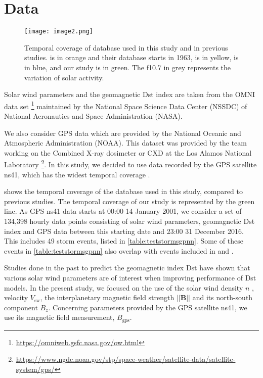 \section{Data}\label{sec:datagpnn}

\begin{figure}
	\texttt{[image: image2.png]}
	\caption{Temporal coverage of database used in this study and in previous studies. \citet{wu1997geomagnetic} 
	is in orange and their database starts in 1963, \citet{Bala2012} is in yellow, \citet{Lazzus} is in blue, and our study is in green. 
	The f10.7 in grey represents the variation of solar activity.}
	\label{fig:datacoverage}
\end{figure}


Solar wind parameters and the geomagnetic Dst index are taken from the OMNI data set 
\footnote{\url{https://omniweb.gsfc.nasa.gov/ow.html}} maintained by the National Space Science Data Center (NSSDC) 
of National Aeronautics and Space Administration (NASA).

We also consider GPS data which are provided by the National Oceanic and Atmospheric Administration (NOAA). 
This dataset was provided by the team working on the Combined X-ray dosimeter or CXD at the 
Los Alamos National Laboratory \footnote{\url{https://www.ngdc.noaa.gov/stp/space-weather/satellite-data/satellite-system/gps/}}. 
In this study, we decided to use data recorded by the GPS satellite ns41, which has the widest temporal coverage 
\citep{morley2017energetic}. 

 shows the temporal coverage of the database used in this study, compared to 
previous studies. The temporal coverage of our study is represented by the green line. As GPS ns41 data 
starts at 00:00 14 January 2001, we consider a set of 134,398 hourly data points consisting of 
solar wind parameters, geomagnetic Dst index and GPS data between this starting date and 23:00 31 December 2016. 
This includes 49 storm events, listed in \cref{table:teststormsgpnn}. Some of these events in 
\cref{table:teststormsgpnn} also overlap with events included in \citet{Ji2012} and 
\citet{ChandorkarDst}. 

Studies done in the past to predict the geomagnetic index Dst have shown that various solar wind parameters 
are of interest when improving performance of Dst models. In the present study, we focused on the use 
of the solar wind density $n$ , velocity  $V_{\text{sw}}$, the interplanetary magnetic field 
strength $\rvert\rvert\mathbf{B}\rvert\rvert$ and its north-south component $B_{z}$. Concerning parameters provided by 
the GPS satellite ns41, we use its magnetic field measurement, $B_{\text{gps}}$.

